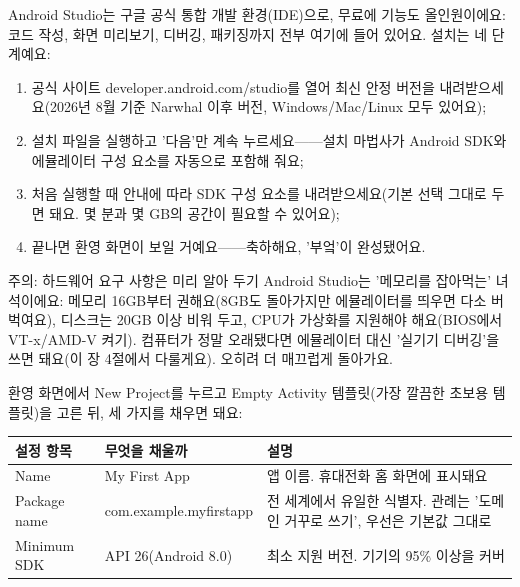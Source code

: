 


Android Studio는 구글 공식 통합 개발 환경(IDE)으로, 무료에 기능도 올인원이에요: 코드 작성, 화면 미리보기, 디버깅, 패키징까지 전부 여기에 들어 있어요. 설치는 네 단계예요:

\begin{enumerate}
  \item 공식 사이트 developer.android.com/studio를 열어 최신 안정 버전을 내려받으세요(2026년 8월 기준 Narwhal 이후 버전, Windows/Mac/Linux 모두 있어요);
  \item 설치 파일을 실행하고 '다음'만 계속 누르세요——설치 마법사가 Android SDK와 에뮬레이터 구성 요소를 자동으로 포함해 줘요;
  \item 처음 실행할 때 안내에 따라 SDK 구성 요소를 내려받으세요(기본 선택 그대로 두면 돼요. 몇 분과 몇 GB의 공간이 필요할 수 있어요);
  \item 끝나면 환영 화면이 보일 거예요——축하해요, '부엌'이 완성됐어요.
\end{enumerate}

\begin{tcbwarn}{주의: 하드웨어 요구 사항은 미리 알아 두기}
Android Studio는 '메모리를 잡아먹는' 녀석이에요: 메모리 16GB부터 권해요(8GB도 돌아가지만 에뮬레이터를 띄우면 다소 버벅여요), 디스크는 20GB 이상 비워 두고, CPU가 가상화를 지원해야 해요(BIOS에서 VT-x/AMD-V 켜기). 컴퓨터가 정말 오래됐다면 에뮬레이터 대신 '실기기 디버깅'을 쓰면 돼요(이 장 4절에서 다룰게요). 오히려 더 매끄럽게 돌아가요.

\end{tcbwarn}


환영 화면에서 New Project를 누르고 Empty Activity 템플릿(가장 깔끔한 초보용 템플릿)을 고른 뒤, 세 가지를 채우면 돼요:

\begin{center}
\begin{tabularx}{\linewidth}{|X|X|X|}
\hline
\textbf{설정 항목} & \textbf{무엇을 채울까} & \textbf{설명} \tabularnewline
\hline
Name & My First App & 앱 이름. 휴대전화 홈 화면에 표시돼요 \tabularnewline
Package name & com.example.myfirstapp & 전 세계에서 유일한 식별자. 관례는 '도메인 거꾸로 쓰기', 우선은 기본값 그대로 \tabularnewline
Minimum SDK & API 26(Android 8.0) & 최소 지원 버전. 기기의 95\% 이상을 커버 \tabularnewline
\hline
\end{tabularx}
\end{center}

